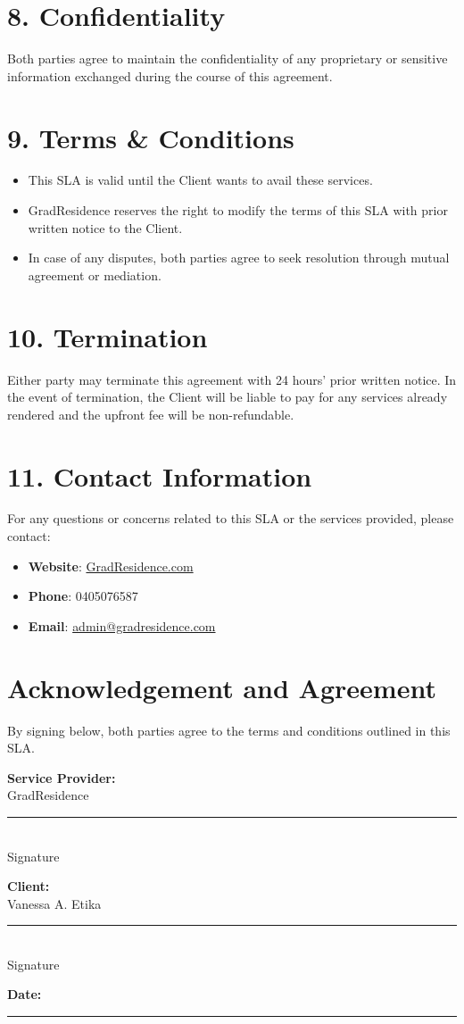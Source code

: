 \documentclass[a4paper,12pt]{article}
\begin{document}
\section*{8. Confidentiality}
Both parties agree to maintain the confidentiality of any proprietary or sensitive information exchanged during the course of this agreement.

\section*{9. Terms \& Conditions}
\begin{itemize}
    \item This SLA is valid until the Client wants to avail these services.
    \item GradResidence reserves the right to modify the terms of this SLA with prior written notice to the Client.
    \item In case of any disputes, both parties agree to seek resolution through mutual agreement or mediation.
\end{itemize}

\section*{10. Termination}
Either party may terminate this agreement with 24 hours' prior written notice. In the event of termination, the Client will be liable to pay for any services already rendered and the upfront fee will be non-refundable.

\section*{11. Contact Information}
For any questions or concerns related to this SLA or the services provided, please contact:
\begin{itemize}
    \item \textbf{Website}: \href{http://www.gradresidence.com}{GradResidence.com}
    \item \textbf{Phone}: 0405076587
    \item \textbf{Email}: \href{mailto:admin@gradresidence.com}{admin@gradresidence.com}
\end{itemize}

\vspace{1cm}

\section*{Acknowledgement and Agreement}
By signing below, both parties agree to the terms and conditions outlined in this SLA.

\vspace{1cm}

\noindent \textbf{Service Provider:} \\
GradResidence \\
\noindent \rule{10cm}{0.4pt} \\
Signature

\vspace{1cm}

\noindent \textbf{Client:} \\
Vanessa A. Etika \\
\noindent \rule{10cm}{0.4pt} \\
Signature

\vspace{1cm}

\noindent \textbf{Date:} \\
\noindent \rule{10cm}{0.4pt}
\end{document}
